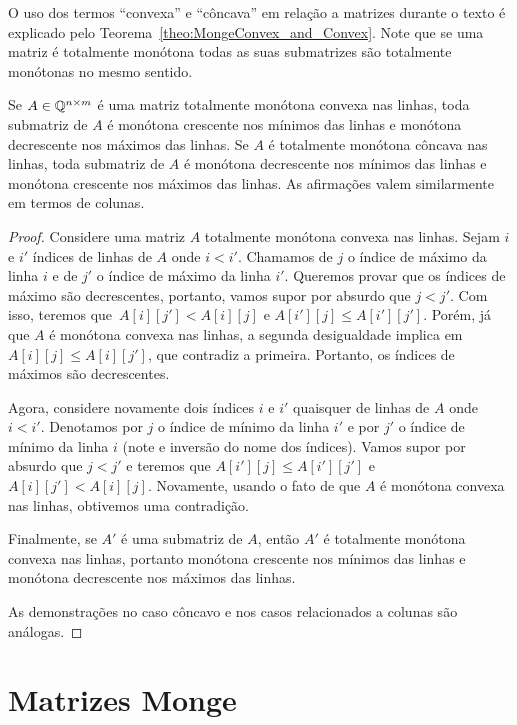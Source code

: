 O uso dos termos ``convexa'' e ``côncava'' em relação a matrizes durante o texto é explicado pelo Teorema~\ref{theo:MongeConvex_and_Convex}. Note que se uma matriz é totalmente monótona todas as suas submatrizes são totalmente monótonas no mesmo sentido.

\begin{lema} \label{lema:MonotoneTotallyMonotone}
Se $A \in \mathbb{Q}^{n \times m}$ é uma matriz totalmente monótona convexa nas linhas, toda submatriz de $A$ é monótona crescente nos mínimos das linhas e monótona decrescente nos máximos das linhas. Se $A$ é totalmente monótona côncava nas linhas, toda submatriz de $A$ é monótona decrescente nos mínimos das linhas e monótona crescente nos máximos das linhas. As afirmações valem similarmente em termos de colunas.
\end{lema}

\begin{proof}
Considere uma matriz $A$ totalmente monótona convexa nas linhas. Sejam $i$ e $i'$ índices de linhas de $A$ onde $i < i'$. Chamamos de $j$ o índice de máximo da linha $i$ e de $j'$ o índice de máximo da linha $i'$. Queremos provar que os índices de máximo são decrescentes, portanto, vamos supor por absurdo que $j < j'$. Com isso, teremos que~${ A[i][j'] < A[i][j] }$ e $A[i'][j] \leq A[i'][j']$. Porém, já que $A$ é monótona convexa nas linhas, a segunda desigualdade implica em $A[i][j] \leq A[i][j']$, que contradiz a primeira. Portanto, os índices de máximos são decrescentes.  

Agora, considere novamente dois índices $i$ e $i'$ quaisquer de linhas de $A$ onde $i < i'$. Denotamos por $j$ o índice de mínimo da linha $i'$ e por $j'$ o índice de mínimo da linha $i$ (note e inversão do nome dos índices). Vamos supor por absurdo que $j < j'$ e teremos que $A[i'][j] \leq A[i'][j']$ e $A[i][j'] < A[i][j]$. Novamente, usando o fato de que $A$ é monótona convexa nas linhas, obtivemos uma contradição.  

Finalmente, se $A'$ é uma submatriz de $A$, então $A'$ é totalmente monótona convexa nas linhas, portanto monótona crescente nos mínimos das linhas e monótona decrescente nos máximos das linhas.

As demonstrações no caso côncavo e nos casos relacionados a colunas são análogas.
\end{proof}

\section{Matrizes Monge} \label{Monge:Monge}

